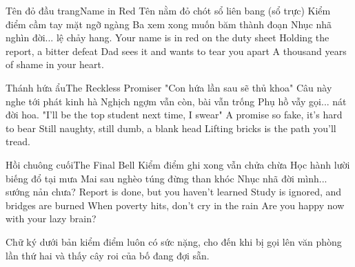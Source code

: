\begin{tutuyetbox}{Tên đỏ đầu trang}{Name in Red}
Tên nằm đỏ chót sổ liên bang (sổ trực)
Kiểm điểm cầm tay mặt ngỡ ngàng
Ba xem xong muốn băm thành đoạn
Nhục nhã nghìn đời... lệ chảy hang.
\tcblower
Your name is in red on the duty sheet
Holding the report, a bitter defeat
Dad sees it and wants to tear you apart
A thousand years of shame in your heart.
\end{tutuyetbox}

\begin{tutuyetbox}{Thánh hứa ẩu}{The Reckless Promiser}
"Con hứa lần sau sẽ thủ khoa"
Câu này nghe tới phát kinh hà
Nghịch ngợm vẫn còn, bài vẫn trống
Phụ hồ vẫy gọi... nát đời hoa.
\tcblower
"I'll be the top student next time, I swear"
A promise so fake, it's hard to bear
Still naughty, still dumb, a blank head
Lifting bricks is the path you'll tread.
\end{tutuyetbox}

\begin{tutuyetbox}{Hồi chuông cuối}{The Final Bell}
Kiểm điểm ghi xong vẫn chửa chừa
Học hành lười biếng đổ tại mưa
Mai sau nghèo túng đừng than khóc
Nhục nhã đời mình... sướng nản chưa?
\tcblower
Report is done, but you haven't learned
Study is ignored, and bridges are burned
When poverty hits, don't cry in the rain
Are you happy now with your lazy brain?
\end{tutuyetbox}
\begin{ghichu}
Chữ ký dưới bản kiểm điểm luôn có sức nặng, cho đến khi bị gọi lên văn phòng lần thứ hai và thấy cây roi của bố đang đợi sẵn.
\end{ghichu}